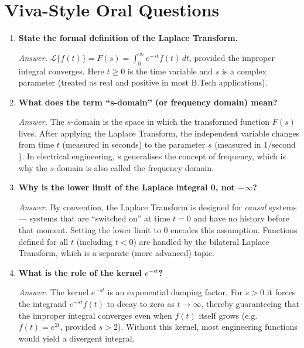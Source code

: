 \documentclass[12pt,a4paper]{article}
\begin{document}
\section{Viva-Style Oral Questions}

\begin{enumerate}[leftmargin=1.5cm, label=\textbf{Q\arabic*.}]

  \item \textbf{State the formal definition of the Laplace Transform.}

  \textit{Answer.}
  $\mathcal{L}\{f(t)\} = F(s) = \int_0^\infty e^{-st} f(t)\, dt$, provided
  the improper integral converges. Here $t \geq 0$ is the time variable and
  $s$ is a complex parameter (treated as real and positive in most B.Tech
  applications).

  \item \textbf{What does the term ``s-domain'' (or frequency domain) mean?}

  \textit{Answer.}
  The $s$-domain is the space in which the transformed function $F(s)$ lives.
  After applying the Laplace Transform, the independent variable changes from
  time $t$ (measured in seconds) to the parameter $s$ (measured in
  $1/\text{second}$). In electrical engineering, $s$ generalises the concept
  of frequency, which is why the $s$-domain is also called the frequency domain.

  \item \textbf{Why is the lower limit of the Laplace integral 0, not
        $-\infty$?}

  \textit{Answer.}
  By convention, the Laplace Transform is designed for \emph{causal} systems
  --- systems that are ``switched on'' at time $t = 0$ and have no history
  before that moment. Setting the lower limit to 0 encodes this assumption.
  Functions defined for all $t$ (including $t < 0$) are handled by the
  bilateral Laplace Transform, which is a separate (more advanced) topic.

  \item \textbf{What is the role of the kernel $e^{-st}$?}

  \textit{Answer.}
  The kernel $e^{-st}$ is an exponential damping factor. For $s > 0$ it
  forces the integrand $e^{-st} f(t)$ to decay to zero as $t \to \infty$,
  thereby guaranteeing that the improper integral converges even when $f(t)$
  itself grows (e.g.\ $f(t) = e^{2t}$, provided $s > 2$). Without this
  kernel, most engineering functions would yield a divergent integral.


\end{enumerate}
\end{document}
